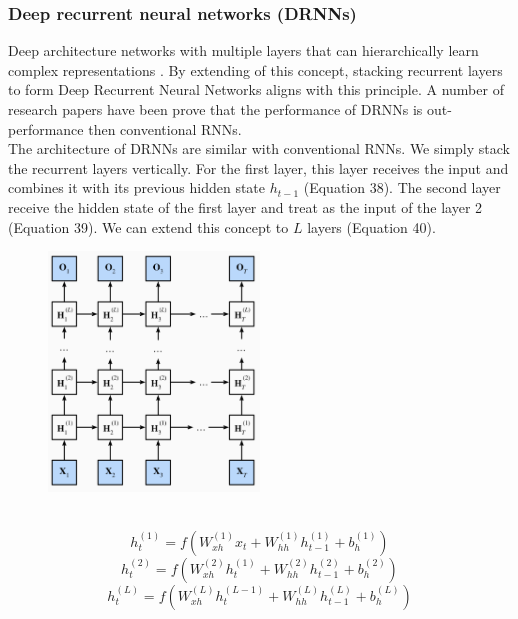 \documentclass[12pt,a4paper]{article}
\begin{document}
\subsubsection{Deep recurrent neural networks (DRNNs)}
Deep architecture networks with multiple layers that can hierarchically learn complex representations \parencite{bengio2009learning}. By extending of this concept, stacking recurrent layers to form Deep Recurrent Neural Networks aligns with this principle. A number of research papers have been prove that the performance of DRNNs is out-performance then conventional RNNs. \parencite{le2010deep, delalleau2011shallow, pascanu2013on}
\\[1ex]
The architecture of DRNNs are similar with conventional RNNs. We simply stack the recurrent layers vertically. For the first layer, this layer receives the input and combines it with its previous hidden state $h_{t-1}$ (Equation 38). The second layer receive the hidden state of the first layer and treat as the input of the layer 2 (Equation 39). We can extend this concept to $L$ layers (Equation 40).
\begin{figure}[!htb]
    \centering
    \includegraphics[width=0.5\textwidth]{../Pic/drnn.png} %
\end{figure}
\\[1ex]
\begin{equation}
    h^{(1)}_t = f(W^{(1)}_{xh} x_{t} + W^{(1)}_{hh} h^{(1)}_{t-1} + b^{(1)}_h)
\end{equation}
\begin{equation}
    h^{(2)}_t = f(W^{(2)}_{xh} h^{(1)}_{t} + W^{(2)}_{hh} h^{(2)}_{t-1} + b^{(2)}_h)
\end{equation}
\begin{equation}
    h^{(L)}_t = f(W^{(L)}_{xh} h^{(L-1)}_{t} + W^{(L)}_{hh} h^{(L)}_{t-1} + b^{(L)}_h)
\end{equation}
\end{document}
